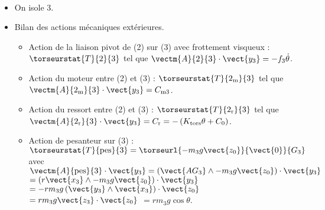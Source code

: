 
\ifprof
\begin{corrige} ~\\
\begin{itemize}
\item On isole 3.

\item Bilan des actions mécaniques extérieures.
\begin{itemize}
\item Action de la liaison pivot de (2) sur (3) 	avec frottement visqueux : $\torseurstat{T}{2}{3}$ tel que $\vectm{A}{2}{3} \cdot \vect{y_3} =  -f_3 \dot{\theta} $.
\item Action du moteur entre (2) et (3) : $\torseurstat{T}{2_{\text{m}}}{3}$ tel que $\vectm{A}{2_{\text{m}}}{3} \cdot \vect{y_3} = C_{\text{m3}} $. 
\item Action du ressort entre (2) et (3) : $\torseurstat{T}{2_{\text{r}}}{3}$ tel que $\vectm{A}{2_{\text{r}}}{3} \cdot \vect{y_3} = C_{\text{r}}= -\left(K_{\text{tors}}\theta + C_0\right) $. 
\item Action de pesanteur sur (3) : $\torseurstat{T}{\text{pes}}{3} = \torseurl{-m_3g \vect{z_0}}{\vect{0}}{G_3}$ avec 
$\vectm{A}{\text{pes}}{3} \cdot \vect{y_3} = \left(\vect{AG_3} \wedge -m_3g \vect{z_0} \right) \cdot \vect{y_3}$
$= \left(r  \vect{x_3} \wedge -m_3g \vect{z_0} \right) \cdot \vect{y_3}$
$= -rm_3g\left(  \vect{y_3} \wedge \vect{x_3} \right) \cdot \vect{z_0} $
$= rm_3g\vect{z_3} \cdot \vect{z_0} $
$= rm_3g\cos \theta $.
\end{itemize}


\end{itemize}
\end{corrige}
